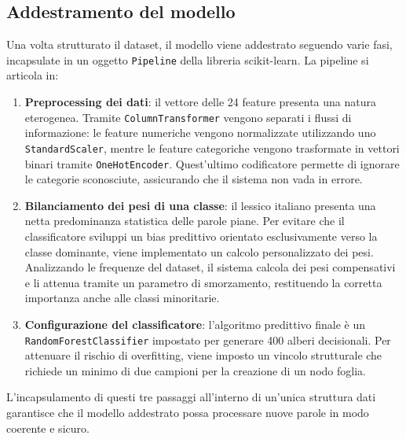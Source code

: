 \subsection{Addestramento del modello}
Una volta strutturato il dataset, il modello viene addestrato seguendo varie fasi, incapsulate in un oggetto \texttt{Pipeline} della libreria scikit-learn. 
La pipeline si articola in:
\begin{enumerate}
      \item \textbf{Preprocessing dei dati}: il vettore delle 24 feature presenta una natura eterogenea. Tramite \texttt{ColumnTransformer} vengono separati 
      i flussi di informazione: le feature numeriche vengono normalizzate utilizzando uno \texttt{StandardScaler}, mentre le feature categoriche vengono 
      trasformate in vettori binari tramite \texttt{OneHotEncoder}. Quest'ultimo codificatore permette di ignorare le categorie sconosciute, assicurando 
      che il sistema non vada in errore.
      \item \textbf{Bilanciamento dei pesi di una classe}: il lessico italiano presenta una netta predominanza statistica delle parole piane. 
      Per evitare che il classificatore sviluppi un bias predittivo orientato esclusivamente verso la classe dominante, viene implementato un calcolo 
      personalizzato dei pesi. Analizzando le frequenze del dataset, il sistema calcola dei pesi compensativi e li attenua tramite un parametro di 
      smorzamento, restituendo la corretta importanza anche alle classi minoritarie.
      \item \textbf{Configurazione del classificatore}: l'algoritmo predittivo finale è un \texttt{RandomForest}\-\texttt{Classifier} impostato per generare 
      400 alberi decisionali. Per attenuare il rischio di overfitting, viene imposto un vincolo strutturale che richiede un minimo di due campioni 
      per la creazione di un nodo foglia.
\end{enumerate}
L'incapsulamento di questi tre passaggi all'interno di un'unica struttura dati garantisce che il modello addestrato possa processare nuove parole 
in modo coerente e sicuro.

